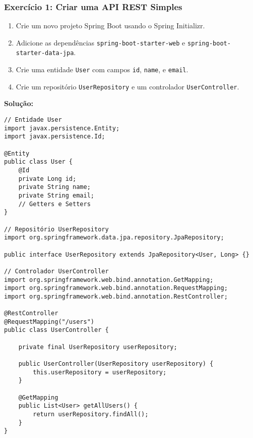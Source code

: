 \documentclass[a4paper,12pt]{book}
\begin{document}
\subsubsection{Exercício 1: Criar uma API REST Simples}
\begin{enumerate}
    \item Crie um novo projeto Spring Boot usando o Spring Initializr.
    \item Adicione as dependências \texttt{spring-boot-starter-web} e \texttt{spring-boot-starter-data-jpa}.
    \item Crie uma entidade \texttt{User} com campos \texttt{id}, \texttt{name}, e \texttt{email}.
    \item Crie um repositório \texttt{UserRepository} e um controlador \texttt{UserController}.
\end{enumerate}

\textbf{Solução:}
\begin{verbatim}
// Entidade User
import javax.persistence.Entity;
import javax.persistence.Id;

@Entity
public class User {
    @Id
    private Long id;
    private String name;
    private String email;
    // Getters e Setters
}

// Repositório UserRepository
import org.springframework.data.jpa.repository.JpaRepository;

public interface UserRepository extends JpaRepository<User, Long> {}

// Controlador UserController
import org.springframework.web.bind.annotation.GetMapping;
import org.springframework.web.bind.annotation.RequestMapping;
import org.springframework.web.bind.annotation.RestController;

@RestController
@RequestMapping("/users")
public class UserController {

    private final UserRepository userRepository;

    public UserController(UserRepository userRepository) {
        this.userRepository = userRepository;
    }

    @GetMapping
    public List<User> getAllUsers() {
        return userRepository.findAll();
    }
}
\end{verbatim}
\end{document}
